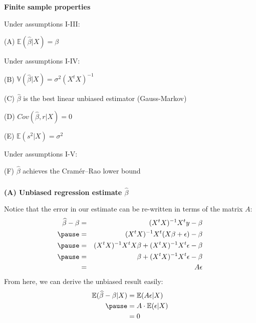 \begin{frame}[fragile] \frametitle{}

{\bf Finite sample properties}

Under assumptions I-III:

\hspace{1cm} (A) $\mathbb{E} (\widehat{\beta} | X) = \beta$ \pause

Under assumptions I-IV:

\hspace{1cm}  (B)  $\mathbb{V} (\widehat{\beta} | X) = \sigma^2 (X^t X)^{-1}$ \pause

\hspace{1cm}  (C) $\widehat{\beta}$ is the best linear unbiased estimator (Gauss-Markov) \pause

\hspace{1cm}  (D) $Cov( \widehat{\beta}, r | X) = 0$ \pause

\hspace{1cm}  (E) $\mathbb{E} (s^2 | X) = \sigma^2$ \pause

Under assumptions I-V:

\hspace{1cm}  (F) $\widehat{\beta}$ achieves the Cramér–Rao lower bound

\end{frame}

\begin{frame}[fragile] \frametitle{}

{\bf (A) Unbiased regression estimate $\widehat{\beta}$}

Notice that the error in our estimate can be re-written in terms of
the matrix $A$:
\begin{eqnarray*}
\widehat{\beta}  - \beta &=& (X^t X)^{-1} X^t y - \beta \\ \pause
&=& (X^t X)^{-1} X^t (X\beta + \epsilon) - \beta \\ \pause
&=& (X^t X)^{-1} X^t X \beta + (X^t X)^{-1} X^t \epsilon - \beta \\ \pause
&=& \beta + (X^t X)^{-1} X^t \epsilon - \beta \\
&=& A \epsilon
\end{eqnarray*}
\pause From here, we can derive the unbiased result easily:
\begin{align*}
\mathbb{E} (\widehat{\beta}  - \beta | X) &= \mathbb{E} (A \epsilon | X) \\ \pause
&= A \cdot \mathbb{E} (\epsilon | X) \\
&= 0
\end{align*}

\end{frame}

